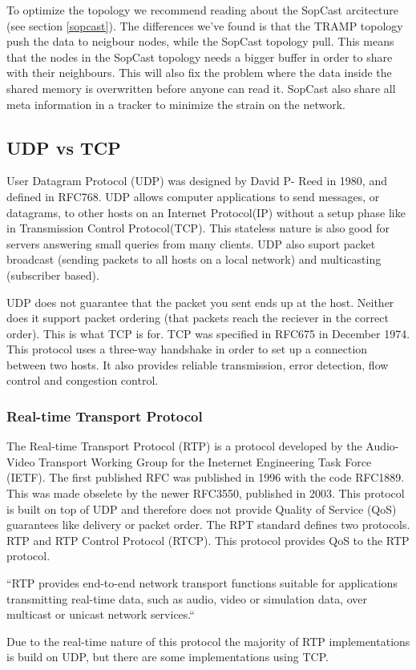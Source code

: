 To optimize the topology we recommend reading about the SopCast arcitecture (see section \ref{sopcast}). The differences we've found is that the TRAMP topology push the data to neigbour nodes, while the SopCast topology pull. This means that the nodes in the SopCast topology needs a bigger buffer in order to share with their neighbours. This will also fix the problem where the data inside the shared memory is overwritten before anyone can read it. SopCast also share all meta information in a tracker to minimize the strain on the network.

\subsection{UDP vs TCP}
User Datagram Protocol (UDP) was designed by David P- Reed in 1980, and defined in RFC768. UDP allows computer applications to send messages, or datagrams, to other hosts on an Internet Protocol(IP) without a setup phase like in Transmission Control Protocol(TCP). This stateless nature is also good for servers answering small queries from many clients. UDP also suport packet broadcast (sending packets to all hosts on a local network) and multicasting (subscriber based).

UDP does not guarantee that the packet you sent ends up at the host. Neither does it support packet ordering (that packets reach the reciever in the correct order). This is what TCP is for. TCP was specified in RFC675 in December 1974. This protocol uses a three-way handshake in order to set up a connection between two hosts. It also provides reliable transmission, error detection, flow control and congestion control. 

\subsubsection{Real-time Transport Protocol}
The Real-time Transport Protocol (RTP) is a protocol developed by the Audio-Video Transport Working Group for the Ineternet Engineering Task Force (IETF). The first published RFC was published in 1996 with the code RFC1889. This was made obselete by the newer RFC3550, published in 2003\cite{RFC3550}. This protocol is built on top of UDP and therefore does not provide Quality of Service (QoS) guarantees like delivery or packet order. The RPT standard defines two protocols. RTP and RTP Control Protocol (RTCP). This protocol provides QoS to the RTP protocol.

``RTP provides end-to-end network transport functions suitable for applications transmitting real-time data, such as audio, video or simulation data, over multicast or unicast network services.``\cite{RFC3550}

Due to the real-time nature of this protocol the majority of RTP implementations is build on UDP, but there are some implementations using TCP.







